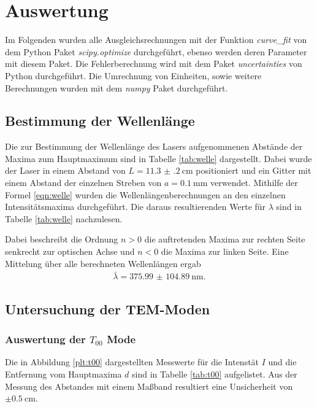 \newpage
\section{Auswertung}

\label{sec:Auswertung}
Im Folgenden wurden alle Ausgleichsrechnungen mit der Funktion \textit{curve\_fit} von dem
Python Paket \textit{scipy.optimize} \cite{scipy} durchgeführt, ebenso werden deren
Parameter mit diesem Paket. Die Fehlerberechnung wird mit dem Paket \textit{uncertainties}
\cite{uncertainties} von Python durchgeführt. Die Umrechnung von
Einheiten, sowie weitere Berechnungen wurden mit dem \textit{numpy} Paket \cite{numpy}
durchgeführt.

\subsection{Bestimmung der Wellenlänge}
Die zur Bestimmung der Wellenlänge des Lasers aufgenommenen Abstände der Maxima
zum Hauptmaximum
sind in Tabelle \ref{tab:welle} dargestellt.
Dabei wurde der Laser in einem Abstand
von $L = \SI{11.3(2)}{\centi\meter}$ positioniert und ein Gitter mit einem
Abstand der einzelnen Streben von $a = \SI{0.1}{\milli\meter}$ verwendet.
Mithilfe der Formel \ref{eqn:welle} wurden die Wellenlängenberechnungen an den
einzelnen Intensitätsmaxima durchgeführt. Die daraus resultierenden Werte für
$\lambda$ sind in Tabelle \ref{tab:welle} nachzulesen.



Dabei beschreibt die Ordnung $n>0$ die auftretenden Maxima zur rechten Seite
senkrecht zur optischen Achse und $n<0$ die Maxima zur linken Seite.
Eine Mittelung über alle berechneten Wellenlängen ergab
\begin{align*}
  \bar{\lambda} = \SI{375.99(10489)}{\nano\meter}.
\end{align*}

\newpage

\subsection{Untersuchung der TEM-Moden}

\subsubsection{Auswertung der $T_{00}$ Mode}
Die in Abbildung \ref{plt:t00} dargestellten Messwerte für die Intenstät $I$
und die Entfernung vom Hauptmaxima $d$ sind in Tabelle \ref{tab:t00}
aufgelistet. Aus der Messung des Abstandes mit einem Maßband resultiert eine
Unsicherheit von $\pm\SI{0.5}{\centi\meter}$.


